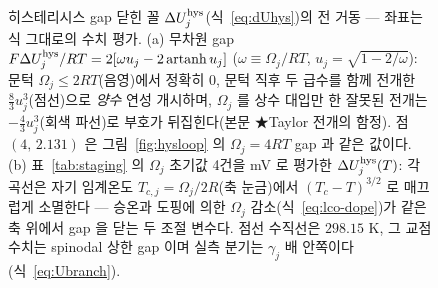 \begin{figure}[t]
{%
}
\caption{히스테리시스 gap 닫힌 꼴 $\Delta U_j^{\mathrm{hys}}$(식~\eqref{eq:dUhys})의 전 거동 --- 좌표는 식
그대로의 수치 평가. (a) 무차원 gap $F\Delta U_j^{\mathrm{hys}}/RT=2[\omega u_j-2\,\mathrm{artanh}\,u_j]$
($\omega\equiv\Omega_j/RT$, $u_j=\sqrt{1-2/\omega}$): 문턱 $\Omega_j\le2RT$(음영)에서 정확히 $0$,
문턱 직후 두 급수를 함께 전개한 $\tfrac83u_j^3$(점선)으로 \emph{양수} 연성 개시하며, $\Omega_j$ 를
상수 대입만 한 잘못된 전개는 $-\tfrac43u_j^3$(회색 파선)로 부호가 뒤집힌다(본문 ★Taylor 전개의 함정).
점 $(4,\,2.131)$ 은 그림~\ref{fig:hysloop} 의 $\Omega_j{=}4RT$ gap 과 같은 값이다.
(b) 표~\ref{tab:staging} 의 $\Omega_j$ 초기값 4건을 mV 로 평가한 $\Delta U_j^{\mathrm{hys}}(T)$: 각 곡선은
자기 임계온도 $T_{c,j}=\Omega_j/2R$(축 눈금)에서 $(T_c-T)^{3/2}$ 로 매끄럽게 소멸한다 --- 승온과
도핑에 의한 $\Omega_j$ 감소(식~\eqref{eq:lco-dope})가 같은 축 위에서 gap 을 닫는 두 조절 변수다.
점선 수직선은 $298.15$ K, 그 교점 수치는 spinodal 상한 gap 이며 실측 분기는 $\gamma_j$ 배 안쪽이다
(식~\eqref{eq:Ubranch}).}
\label{fig:hysgap}
\end{figure}

